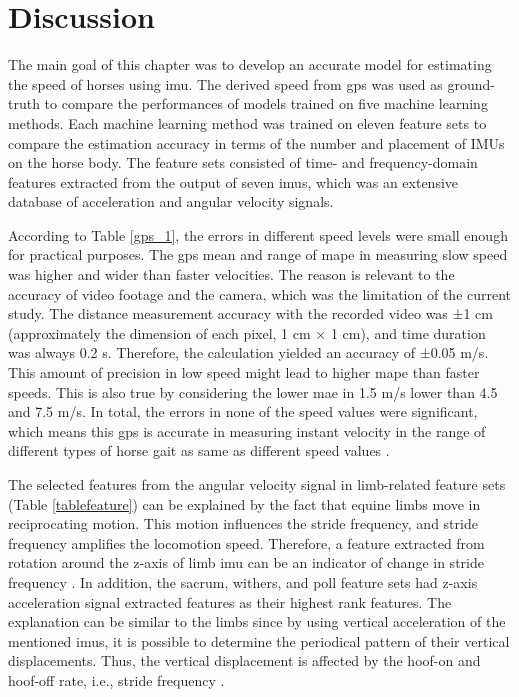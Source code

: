\section{Discussion}
\label{sec:discussion}

The main goal of this chapter was to develop an accurate model for estimating the speed of horses using \gls{imu}. The derived speed from \gls{gps} was used as ground-truth to compare the performances of models trained on five machine learning methods. Each machine learning method was trained on eleven feature sets to compare the estimation accuracy in terms of the number and placement of IMUs on the horse body. The feature sets consisted of time- and frequency-domain features extracted from the output of seven \gls{imu}s, which was an extensive database of acceleration and angular velocity signals.


According to Table \ref{gps_1}, the errors in different speed levels were small enough for practical purposes. The \gls{gps} mean and range of \gls{mape} in measuring slow speed was higher and wider than faster velocities.  The reason is relevant to the accuracy of video footage and the camera, which was the limitation of the current study. The distance measurement accuracy with the recorded video was ±1 cm (approximately the dimension of each pixel, 1 cm × 1 cm), and time duration was always 0.2 s. Therefore, the calculation yielded an accuracy of ±0.05 m/s. This amount of precision in low speed might lead to higher \gls{mape} than faster speeds. This is also true by considering the lower \gls{mae} in 1.5 m/s lower than 4.5 and 7.5 m/s. In total, the errors in none of the speed values were significant, which means this \gls{gps} is accurate in measuring instant velocity in the range of different types of horse gait as same as different speed values \cite{Robilliard187}.


The selected features from the angular velocity signal in limb-related feature sets (Table \ref{tablefeature}) can be explained by the fact that equine limbs move in reciprocating motion. This motion influences the stride frequency, and stride frequency amplifies the locomotion speed. Therefore, a feature extracted from rotation around the z-axis of limb \gls{imu} can be an indicator of change in stride frequency \cite{doi:10.1111/eve.12400,1inproceedings,PMID}. In addition, the sacrum, withers, and poll feature sets had z-axis acceleration signal extracted features as their highest rank features. The explanation can be similar to the limbs since by using vertical acceleration of the mentioned \gls{imu}s, it is possible to determine the periodical pattern of their vertical displacements. Thus, the vertical displacement is affected by the hoof-on and hoof-off rate, i.e., stride frequency \cite{adsd1,456}. 


